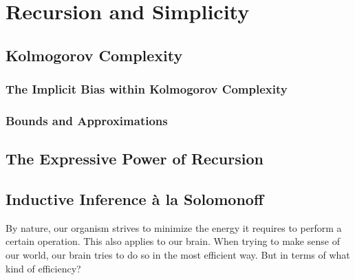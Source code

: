 

\chapter{Recursion and Simplicity}
\section{Kolmogorov Complexity}

\subsection{The Implicit Bias within Kolmogorov Complexity}
\subsection{Bounds and Approximations}

\section{The Expressive Power of Recursion}

\section{Inductive Inference à la Solomonoff}
By nature, our organism strives to minimize the energy it requires to perform a certain operation. This also applies to our brain. When trying to make sense of our world, our brain tries to do so in the most efficient way. But in terms of what kind of efficiency?

